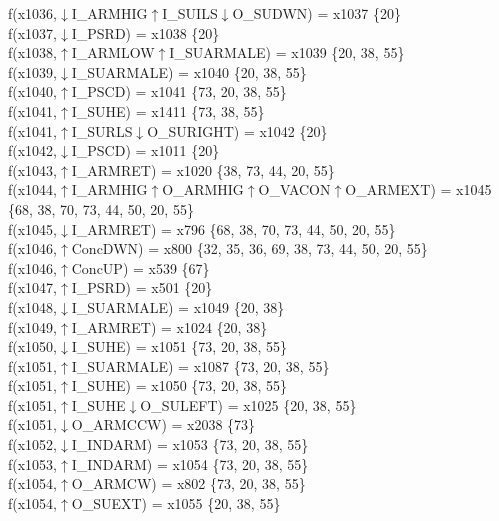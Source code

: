 f(x1036,$\downarrow$I\_ARMHIG$\uparrow$I\_SUILS$\downarrow$O\_SUDWN) = x1037 \{20\} \\  
f(x1037,$\downarrow$I\_PSRD) = x1038 \{20\} \\  
f(x1038,$\uparrow$I\_ARMLOW$\uparrow$I\_SUARMALE) = x1039 \{20, 38, 55\} \\  
f(x1039,$\downarrow$I\_SUARMALE) = x1040 \{20, 38, 55\} \\  
f(x1040,$\uparrow$I\_PSCD) = x1041 \{73, 20, 38, 55\} \\  
f(x1041,$\uparrow$I\_SUHE) = x1411 \{73, 38, 55\} \\  
f(x1041,$\uparrow$I\_SURLS$\downarrow$O\_SURIGHT) = x1042 \{20\} \\  
f(x1042,$\downarrow$I\_PSCD) = x1011 \{20\} \\  
f(x1043,$\uparrow$I\_ARMRET) = x1020 \{38, 73, 44, 20, 55\} \\  
f(x1044,$\uparrow$I\_ARMHIG$\uparrow$O\_ARMHIG$\uparrow$O\_VACON$\uparrow$O\_ARMEXT) = x1045 \{68, 38, 70, 73, 44, 50, 20, 55\} \\  
f(x1045,$\downarrow$I\_ARMRET) = x796 \{68, 38, 70, 73, 44, 50, 20, 55\} \\  
f(x1046,$\uparrow$ConcDWN) = x800 \{32, 35, 36, 69, 38, 73, 44, 50, 20, 55\} \\  
f(x1046,$\uparrow$ConcUP) = x539 \{67\} \\  
f(x1047,$\uparrow$I\_PSRD) = x501 \{20\} \\  
f(x1048,$\downarrow$I\_SUARMALE) = x1049 \{20, 38\} \\  
f(x1049,$\uparrow$I\_ARMRET) = x1024 \{20, 38\} \\  
f(x1050,$\downarrow$I\_SUHE) = x1051 \{73, 20, 38, 55\} \\  
f(x1051,$\uparrow$I\_SUARMALE) = x1087 \{73, 20, 38, 55\} \\  
f(x1051,$\uparrow$I\_SUHE) = x1050 \{73, 20, 38, 55\} \\  
f(x1051,$\uparrow$I\_SUHE$\downarrow$O\_SULEFT) = x1025 \{20, 38, 55\} \\  
f(x1051,$\downarrow$O\_ARMCCW) = x2038 \{73\} \\  
f(x1052,$\downarrow$I\_INDARM) = x1053 \{73, 20, 38, 55\} \\  
f(x1053,$\uparrow$I\_INDARM) = x1054 \{73, 20, 38, 55\} \\  
f(x1054,$\uparrow$O\_ARMCW) = x802 \{73, 20, 38, 55\} \\  
f(x1054,$\uparrow$O\_SUEXT) = x1055 \{20, 38, 55\} \\  
